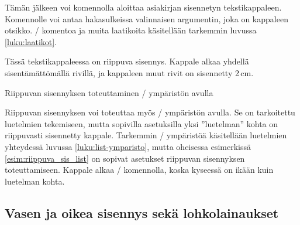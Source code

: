\begin{koodilohkosis}
  \newlength{\sarkain}
  \setlength{\sarkain}{2.3cm}
  \newcommand{\kappale}[1][]{\par\hangpara{2\sarkain}{1}%
    \makebox[2\sarkain][l]{\ignorespaces #1}\ignorespaces}
\end{koodilohkosis}

Tämän jälkeen voi komennolla  aloittaa asiakirjan
sisennetyn tekstikappaleen. Komennolle voi antaa hakasulkeissa
valinnaisen argumentin, joka on kappaleen otsikko. \-/
komentoa ja muita laatikoita käsitellään tarkemmin luvussa
\ref{luku:laatikot}.

\begin{esimerkki*}
  \komentoi{,}

\begin{koodilohko}
  \begin{list}{}{
      \setlength{\leftmargin}{2cm}
      \setlength{\itemindent}{-2cm}
    }
  \item Tässä tekstikappaleessa on riippuva sisennys. Kappale alkaa
    yhdellä sisentämättömällä rivillä, ja kappaleen muut rivit on
    sisennetty 2\,cm.
  \end{list}
\end{koodilohko}
\caption{Riippuvan sisennyksen toteuttaminen \-/
  ympäristön avulla}
\label{esim:riippuva_sis_list}
\end{esimerkki*}

Riippuvan sisennyksen voi toteuttaa myös \-/ ympäristön
avulla. Se on tarkoitettu luetelmien tekemiseen, mutta sopivilla
asetuksilla yksi ''luetelman'' kohta on riippuvasti sisennetty kappale.
Tarkemmin \-/ ympäristöä käsitellään luetelmien
yhteydessä luvussa \ref{luku:list-ymparisto}, mutta oheisessa
esimerkissä \ref{esim:riippuva_sis_list} on sopivat asetukset riippuvan
sisennyksen toteuttamiseen. Kappale alkaa \-/ komennolla,
koska kyseessä on ikään kuin luetelman kohta.

\subsection{Vasen ja oikea sisennys sekä lohkolainaukset}
\label{luku:lohkolainaukset}

